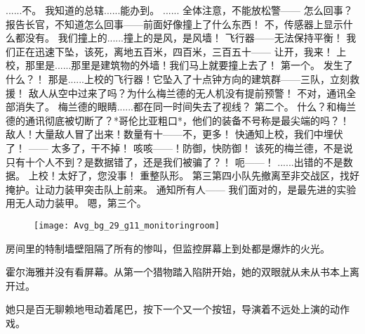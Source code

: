 \documentclass[openany]{book}
\begin{document}
\begin{dialogue}
     ......不。
     我知道的总辖......能办到。
     ......
     全体注意，不能放松警——
     怎么回事？
     报告长官，不知道怎么回事——前面好像撞上了什么东西！
     不，传感器上显示什么都没有。
     我们撞上的......撞上的是风，是风墙！
     飞行器——无法保持平衡！
     我们正在迅速下坠，该死，离地五百米，四百米，三百五十——
     让开，我来！
     上校，那里是......那里是建筑物的外墙！我们马上就要撞上去了！
     第一个。
     发生了什么？！
     那是......上校的飞行器！它坠入了十点钟方向的建筑群——三队，立刻救援！
     敌人从空中过来了吗？为什么梅兰德的无人机没有提前预警！
     不对，通讯全部消失了。
     梅兰德的眼睛......都在同一时间失去了视线？
     第二个。
     什么？和梅兰德的通讯彻底被切断了？*哥伦比亚粗口*，他们的装备不号称是最尖端的吗？！
     敌人！大量敌人冒了出来！数量有十——不，更多！
     快通知上校，我们中埋伏了！
     ——
     太多了，干不掉！
     咳咳——！防御，快防御！
     该死的梅兰德，不是说只有十个人不到？是数据错了，还是我们被骗了？！
     呃——！
     ......出错的不是数据。
     上校！太好了，您没事！
     重整队形。
     第三第四小队先撤离至非交战区，找好掩护。让动力装甲突击队上前来。
     通知所有人——
     我们面对的，是最先进的实验用无人动力装甲。
     嗯，第三个。
\end{dialogue}

\begin{figure}[h]
    \centering
    \texttt{[image: Avg\_bg\_29\_g11\_monitoringroom]}
\end{figure}
\par
房间里的特制墙壁阻隔了所有的惨叫，但监控屏幕上到处都是爆炸的火光。\par
霍尔海雅并没有看屏幕。从第一个猎物踏入陷阱开始，她的双眼就从未从书本上离开过。\par
她只是百无聊赖地甩动着尾巴，按下一个又一个按钮，导演着不远处上演的动作戏。
\end{document}
